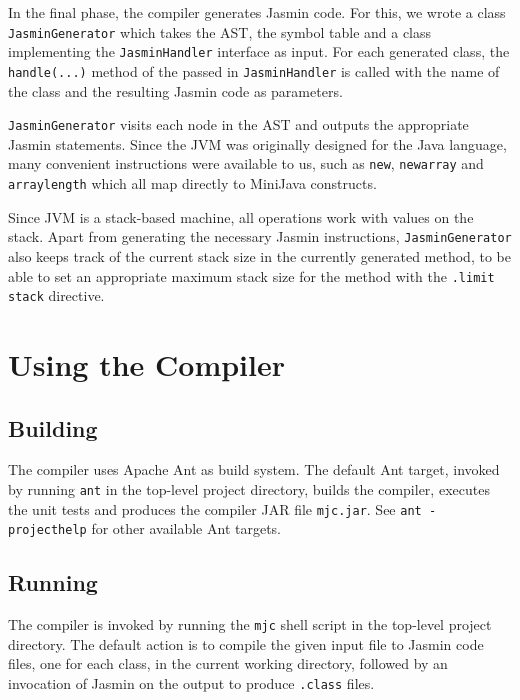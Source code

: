 \documentclass[a4paper,11pt]{article}
\begin{document}
In the final phase, the compiler generates Jasmin code. For this, we wrote a class
\texttt{JasminGenerator} which takes the AST, the symbol table and a class implementing
the \texttt{JasminHandler} interface as input. For each generated class, the
\texttt{handle(...)} method of the passed in \texttt{JasminHandler} is called with the
name of the class and the resulting Jasmin code as parameters.

\texttt{JasminGenerator} visits each node in the AST and outputs the appropriate
Jasmin statements. Since the JVM was originally designed for the Java language, many convenient
instructions were available to us, such as \texttt{new}, \texttt{newarray} and \texttt{arraylength}
which all map directly to MiniJava constructs.

Since JVM is a stack-based machine, all operations work with values on
the stack. Apart from generating the necessary Jasmin instructions, \texttt{JasminGenerator} also
keeps track of the current stack size in the currently generated method, to be
able to set an appropriate maximum stack size for the method with the
\texttt{.limit stack} directive.

\section{Using the Compiler}

\label{sec:using}

\subsection{Building}

The compiler uses Apache Ant as build system. The default Ant target, invoked
by running \texttt{ant} in the top-level project directory, builds the compiler,
executes the unit tests and produces the compiler JAR file \texttt{mjc.jar}. See
\texttt{ant -projecthelp} for other available Ant targets.

\subsection{Running}

The compiler is invoked by running the \texttt{mjc} shell script in the top-level
project directory. The default action is to compile the given input file to Jasmin
code files, one for each class, in the current working directory, followed by an
invocation of Jasmin on the output to produce \texttt{.class} files.
\end{document}

